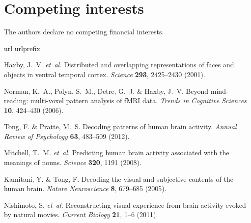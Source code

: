 \documentclass[english]{article}
\begin{document}
\section*{Competing interests}
The authors declare no competing financial interests.


%

\begin{thebibliography}{10}
\expandafter\ifx\csname url\endcsname\relax
  \def\url#1{\texttt{#1}}\fi
\expandafter\ifx\csname urlprefix\endcsname\relax\def\urlprefix{URL }\fi
\providecommand{\bibinfo}[2]{#2}
\providecommand{\eprint}[2][]{\url{#2}}

\bibinfo{author}{Haxby, J.~V.} \emph{et~al.}
\newblock \bibinfo{title}{Distributed and overlapping representations of faces
  and objects in ventral temporal cortex}.
\newblock \emph{\bibinfo{journal}{Science}} \textbf{\bibinfo{volume}{293}},
  \bibinfo{pages}{2425--2430} (\bibinfo{year}{2001}).

\bibinfo{author}{Norman, K.~A.}, \bibinfo{author}{Polyn, S.~M.},
  \bibinfo{author}{Detre, G.~J.} \& \bibinfo{author}{Haxby, J.~V.}
\newblock \bibinfo{title}{Beyond mind-reading: multi-voxel pattern analysis of
  {fMRI} data}.
\newblock \emph{\bibinfo{journal}{Trends in Cognitive Sciences}}
  \textbf{\bibinfo{volume}{10}}, \bibinfo{pages}{424--430}
  (\bibinfo{year}{2006}).

\bibinfo{author}{Tong, F.} \& \bibinfo{author}{Pratte, M.~S.}
\newblock \bibinfo{title}{Decoding patterns of human brain activity}.
\newblock \emph{\bibinfo{journal}{Annual Review of Psychology}}
  \textbf{\bibinfo{volume}{63}}, \bibinfo{pages}{483--509}
  (\bibinfo{year}{2012}).

\bibinfo{author}{Mitchell, T.~M.} \emph{et~al.}
\newblock \bibinfo{title}{Predicting human brain activity associated with the
  meanings of nouns}.
\newblock \emph{\bibinfo{journal}{Science}} \textbf{\bibinfo{volume}{320}},
  \bibinfo{pages}{1191} (\bibinfo{year}{2008}).

\bibinfo{author}{Kamitani, Y.} \& \bibinfo{author}{Tong, F.}
\newblock \bibinfo{title}{Decoding the visual and subjective contents of the
  human brain}.
\newblock \emph{\bibinfo{journal}{Nature Neuroscience}}
  \textbf{\bibinfo{volume}{8}}, \bibinfo{pages}{679--685}
  (\bibinfo{year}{2005}).

\bibinfo{author}{Nishimoto, S.} \emph{et~al.}
\newblock \bibinfo{title}{Reconstructing visual experience from brain activity
  evoked by natural movies}.
\newblock \emph{\bibinfo{journal}{Current Biology}}
  \textbf{\bibinfo{volume}{21}}, \bibinfo{pages}{1--6} (\bibinfo{year}{2011}).


\end{thebibliography}
\end{document}

